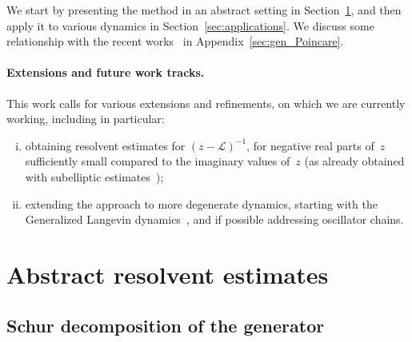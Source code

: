 \documentclass{article}
\newcommand{\cL}{\mathcal{L}}
\begin{document}
We start by presenting the method in an abstract setting in Section~\ref{sec:abstract}, and then apply it to various dynamics in Section~\ref{sec:applications}. We discuss some relationship with the recent works~\cite{AM19,CLW19} in Appendix~\ref{sec:gen_Poincare}.

\paragraph{Extensions and future work tracks.}
This work calls for various extensions and refinements, on which we are currently working, including in particular: 
\begin{enumerate}[(i)]
    \item obtaining resolvent estimates for $(z -\cL)^{-1}$, for negative real parts of~$z$ sufficiently small compared to the imaginary values of~$z$ (as already obtained with subelliptic estimates~\cite{EH03,HN04,HN05}); 
    \item extending the approach to more degenerate dynamics, starting with the Generalized Langevin dynamics~\cite{OP11}, and if possible addressing oscillator chains.
    \end{enumerate}

\section{Abstract resolvent estimates}
\label{sec:abstract}

\subsection{Schur decomposition of the generator}
\end{document}
